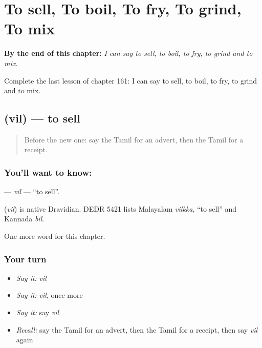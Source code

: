 
\chapter{To sell, To boil, To fry, To grind, To mix}
\label{ch:ta-to-sell-to-boil-to-fry-to-grind-to-mix}

\begin{chapteropening}
\textbf{By the end of this chapter:} \emph{I can say to sell, to boil, to fry, to grind and to mix.}

Complete the last lesson of chapter 161: I can say to sell, to boil, to fry, to grind and to mix.
\end{chapteropening}

\section[\texorpdfstring{\ta{வில்} (vil)}{வில் (vil)}]{ (vil) — to sell}

\label{lesson:TA-C161-vil}



\begin{quote}
Before the new one: say the Tamil for an advert, then the Tamil for a receipt.
\end{quote}

\subsection*{You'll want to know: }
\textbf{} — \emph{vil} — \textquotedblleft{}to sell\textquotedblright{}.

\begin{cousinweb}
\textbf{} (\emph{vil}) is native Dravidian. DEDR 5421 lists Malayalam \emph{vilkka}, \textquotedblleft{}to sell\textquotedblright{} and Kannada \emph{bil}.
\end{cousinweb}

\begin{grammarlens}[title={What you've built}]
One more word for this chapter.
\end{grammarlens}

\subsection*{Your turn}
\begin{itemize}
\raggedright
  \item \emph{Say it:} \emph{vil}
  \item \emph{Say it:} \emph{vil}, once more
  \item \emph{Say it:} say \emph{vil}
  \item \emph{Recall:} say the Tamil for an advert, then the Tamil for a receipt, then say \emph{vil} again
\end{itemize}

